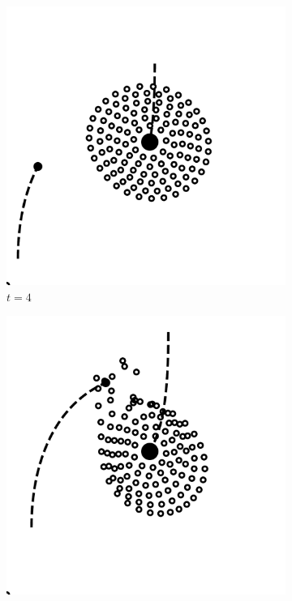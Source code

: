 \documentclass[11pt,twocolumn]{article}
\begin{document}
           \begin{figure}[!htbp]
        \captionsetup[subfigure]{labelformat=empty}
  			\begin{subfigure}[b]{0.2\textwidth}
    			\includegraphics[width=\textwidth]{fig_4/Fig4_4_000000_0.pdf}
    			\caption{$t = 4$}
  			\end{subfigure}
  			\hfill
  			\begin{subfigure}[b]{0.2\textwidth}
    			\includegraphics[width=\textwidth]{fig_4/Fig4_6_000000_0.pdf}

\end{subfigure}
\end{figure}
\end{document}
